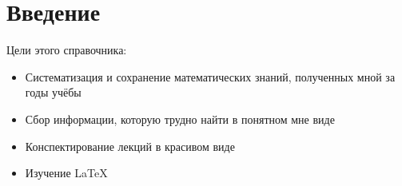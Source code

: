 \chapter*{Введение}
Цели этого справочника:\\
\begin{itemize}
	\item Систематизация и сохранение математических знаний, полученных мной за годы учёбы
	\item Сбор информации, которую трудно найти в понятном мне виде
	\item Конспектирование лекций в красивом виде
	\item Изучение LaTeX
\end{itemize} 